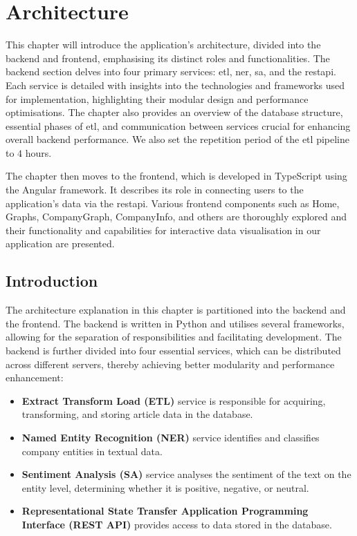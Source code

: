 \chapter{Architecture}
\label{chap:architecture}
This chapter will introduce the application's architecture, divided into the backend and frontend, emphasising its distinct roles and functionalities. The backend section delves into four primary services: \acrshort{etl}, \acrshort{ner}, \acrshort{sa}, and the \acrshort{restapi}. Each service is detailed with insights into the technologies and frameworks used for implementation, highlighting their modular design and performance optimisations. The chapter also provides an overview of the database structure, essential phases of \acrshort{etl}, and communication between services crucial for enhancing overall backend performance. We also set the repetition period of the \acrshort{etl} pipeline to $4$ hours.

The chapter then moves to the frontend, which is developed in TypeScript using the Angular framework. It describes its role in connecting users to the application's data via the \acrshort{restapi}. Various frontend components such as Home, Graphs, CompanyGraph, CompanyInfo, and others are thoroughly explored and their functionality and capabilities for interactive data visualisation in our application are presented.

\section{Introduction}
\label{sec:architecture-introduction}
The architecture explanation in this chapter is partitioned into the backend and the frontend. The backend is written in Python and utilises several frameworks, allowing for the separation of responsibilities and facilitating development. The backend is further divided into four essential services, which can be distributed across different servers, thereby achieving better modularity and performance enhancement:

\begin{itemize}
\item \textbf{Extract Transform Load (ETL)} service is responsible for acquiring, transforming, and storing article data in the database.
\item \textbf{Named Entity Recognition (NER)} service identifies and classifies company entities in textual data.
\item \textbf{Sentiment Analysis (SA)} service analyses the sentiment of the text on the entity level, determining whether it is positive, negative, or neutral.
\item \textbf{Representational State Transfer Application Programming Interface (REST API)} provides access to data stored in the database.
\end{itemize}

